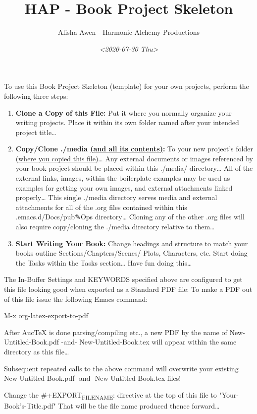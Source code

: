 \documentclass[11pt]{article}
\author{Alisha Awen - Harmonic Alchemy Productions}
\date{\textit{<2020-07-30 Thu>}}
\title{HAP - Book Project Skeleton}
\begin{document}
\maketitle
\tableofcontents

To use this Book Project Skeleton (template) for your own projects, perform the following three steps:

\begin{enumerate}
\item \textbf{Clone a Copy of this File:} Put it where you normally organize your writing projects.  Place it within its own folder named after your intended project title\ldots{}

\item \textbf{Copy/Clone ./media \uline{(and all its contents)}:} To your new project's folder \uline{(where you copied this file)}\ldots{}  Any external documents or images referenced by your book project should be placed within this ./media/ directory\ldots{} All of the external links, images, within the boilerplate examples may be used as examples for getting your own images, and external attachments linked properly\ldots{}  This single ./media directory serves media and external attachments for all of the .org files contained within this .emacs.d/Docs/pub✎Ops directory\ldots{} Cloning any of the other .org files will also require copy/cloning the ./media directory relative to them\ldots{}

\item \textbf{Start Writing Your Book:}  Change headings and structure to match your books outline Sections/Chapters/Scenes/ Plots, Characters, etc. Start doing the Tasks within the Tasks section\ldots{} Have fun doing this\ldots{}
\end{enumerate}

The In-Buffer Settings and KEYWORDS specified above are configured to get this file looking good when exported as a Standard PDF file:  To make a PDF out of this file issue the following Emacs command:

M-x org-latex-export-to-pdf

After AucTeX is done parsing/compiling etc., a new PDF by the name of New-Untitled-Book.pdf -and- New-Untitled-Book.tex will appear within the same directory as this file\ldots{}  

Subsequent repeated calls to the above command will overwrite your existing New-Untitled-Book.pdf -and- New-Untitled-Book.tex files! 

Change the \#+EXPORT\textsubscript{FILE}\textsubscript{NAME}: directive at the top of this file to "Your-Book's-Title.pdf" That will be the file name produced thence forward\ldots{}
\end{document}
